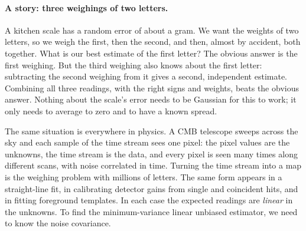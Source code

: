 \paragraph{A story: three weighings of two letters.}
A kitchen scale has a random error of about a gram. We want the weights of
two letters, so we weigh the first, then the second, and then, almost by
accident, both together. What is our best estimate of the first letter? The
obvious answer is the first weighing. But the third weighing also knows
about the first letter: subtracting the second weighing from it gives a
second, independent estimate. Combining all three readings, with the right
signs and weights, beats the obvious answer. Nothing about the scale's error
needs to be Gaussian for this to work; it only needs to average to zero and
to have a known spread.

The same situation is everywhere in physics. A CMB telescope sweeps across
the sky and each sample of the time stream sees one pixel: the pixel values
are the unknowns, the time stream is the data, and every pixel is seen many
times along different scans, with noise correlated in time. Turning the time
stream into a map is the weighing problem with millions of letters. The same form appears in a straight-line fit, in calibrating detector gains
from single and coincident hits, and in fitting foreground templates. In each
case the expected readings are \emph{linear} in the unknowns. To find the
minimum-variance linear unbiased estimator, we need to know the noise
covariance.


